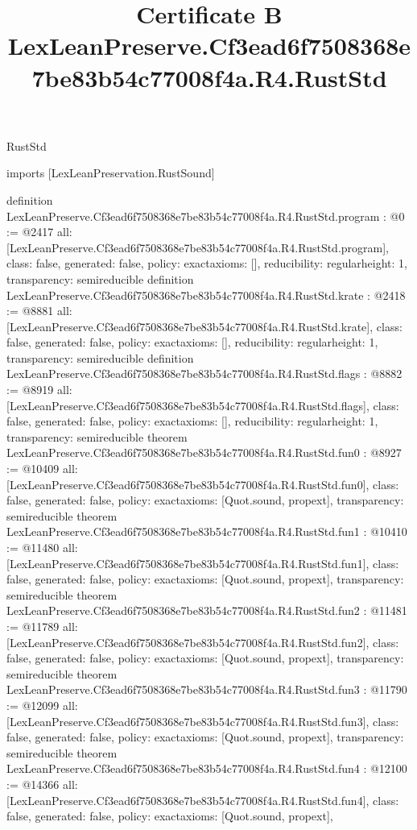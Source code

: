 \begin{lexlean}{RustStd}
\title{Certificate B LexLeanPreserve.Cf3ead6f7508368e7be83b54c77008f4a.R4.RustStd}
\begin{coremodule}
imports [LexLeanPreservation.RustSound]

definition LexLeanPreserve.Cf3ead6f7508368e7be83b54c77008f4a.R4.RustStd.program : @0 := @2417 {
  all: [LexLeanPreserve.Cf3ead6f7508368e7be83b54c77008f4a.R4.RustStd.program],
  class: false,
  generated: false,
  policy: exact{axioms: []},
  reducibility: regular{height: 1},
  transparency: semireducible
}
definition LexLeanPreserve.Cf3ead6f7508368e7be83b54c77008f4a.R4.RustStd.krate : @2418 := @8881 {
  all: [LexLeanPreserve.Cf3ead6f7508368e7be83b54c77008f4a.R4.RustStd.krate],
  class: false,
  generated: false,
  policy: exact{axioms: []},
  reducibility: regular{height: 1},
  transparency: semireducible
}
definition LexLeanPreserve.Cf3ead6f7508368e7be83b54c77008f4a.R4.RustStd.flags : @8882 := @8919 {
  all: [LexLeanPreserve.Cf3ead6f7508368e7be83b54c77008f4a.R4.RustStd.flags],
  class: false,
  generated: false,
  policy: exact{axioms: []},
  reducibility: regular{height: 1},
  transparency: semireducible
}
theorem LexLeanPreserve.Cf3ead6f7508368e7be83b54c77008f4a.R4.RustStd.fun0 : @8927 := @10409 {
  all: [LexLeanPreserve.Cf3ead6f7508368e7be83b54c77008f4a.R4.RustStd.fun0],
  class: false,
  generated: false,
  policy: exact{axioms: [Quot.sound, propext]},
  transparency: semireducible
}
theorem LexLeanPreserve.Cf3ead6f7508368e7be83b54c77008f4a.R4.RustStd.fun1 : @10410 := @11480 {
  all: [LexLeanPreserve.Cf3ead6f7508368e7be83b54c77008f4a.R4.RustStd.fun1],
  class: false,
  generated: false,
  policy: exact{axioms: [Quot.sound, propext]},
  transparency: semireducible
}
theorem LexLeanPreserve.Cf3ead6f7508368e7be83b54c77008f4a.R4.RustStd.fun2 : @11481 := @11789 {
  all: [LexLeanPreserve.Cf3ead6f7508368e7be83b54c77008f4a.R4.RustStd.fun2],
  class: false,
  generated: false,
  policy: exact{axioms: [Quot.sound, propext]},
  transparency: semireducible
}
theorem LexLeanPreserve.Cf3ead6f7508368e7be83b54c77008f4a.R4.RustStd.fun3 : @11790 := @12099 {
  all: [LexLeanPreserve.Cf3ead6f7508368e7be83b54c77008f4a.R4.RustStd.fun3],
  class: false,
  generated: false,
  policy: exact{axioms: [Quot.sound, propext]},
  transparency: semireducible
}
theorem LexLeanPreserve.Cf3ead6f7508368e7be83b54c77008f4a.R4.RustStd.fun4 : @12100 := @14366 {
  all: [LexLeanPreserve.Cf3ead6f7508368e7be83b54c77008f4a.R4.RustStd.fun4],
  class: false,
  generated: false,
  policy: exact{axioms: [Quot.sound, propext]},
}
\end{coremodule}
\end{lexlean}
